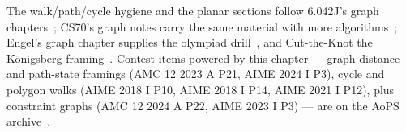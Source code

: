 \chapternotes
The walk/path/cycle hygiene and the planar sections follow 6.042J's
graph chapters~\cite{mcs}; CS70's graph notes carry the same material
with more algorithms~\cite{cs70}; Engel's graph chapter supplies the
olympiad drill~\cite{engel}, and Cut-the-Knot the Königsberg
framing~\cite{cuttheknot}. Contest items powered by this chapter ---
graph-distance and path-state framings (AMC 12 2023 A P21,
AIME 2024 I P3), cycle and polygon walks (AIME 2018 I P10,
AIME 2018 I P14, AIME 2021 I P12), plus constraint graphs
(AMC 12 2024 A P22, AIME 2023 I P3) --- are on the AoPS
archive~\cite{aops-amc}.
